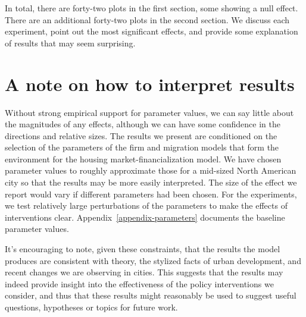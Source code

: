In total, there are forty-two plots in the first section, some showing a null effect. There are an additional forty-two plots in the second section. We discuss each experiment, point out the most significant effects, and provide some explanation of results that may seem surprising.  

\section{A note on how to interpret results}

Without strong empirical support for parameter values, we can say little about the magnitudes of any effects, although we can have some confidence in the directions and relative sizes.  
The results we present are conditioned on the selection of the parameters of the firm and migration models that form the environment for the housing market-financialization model. We have chosen parameter values to roughly approximate those for a mid-sized North American city so that the results may be more easily interpreted. The size of the effect we report would vary if different parameters had been chosen. %
For the experiments, we test relatively large perturbations of the parameters to make the effects of interventions clear. Appendix~\ref{appendix-parameters} documents the baseline parameter values. 

It's encouraging to note, given these constraints, that the results the model produces are consistent with theory, the stylized facts of urban development, and recent changes we are observing in cities. 
This suggests that the results may indeed provide insight into the effectiveness of the policy interventions we consider, and thus that these results might reasonably be used to suggest useful questions, hypotheses or topics for future work. 

